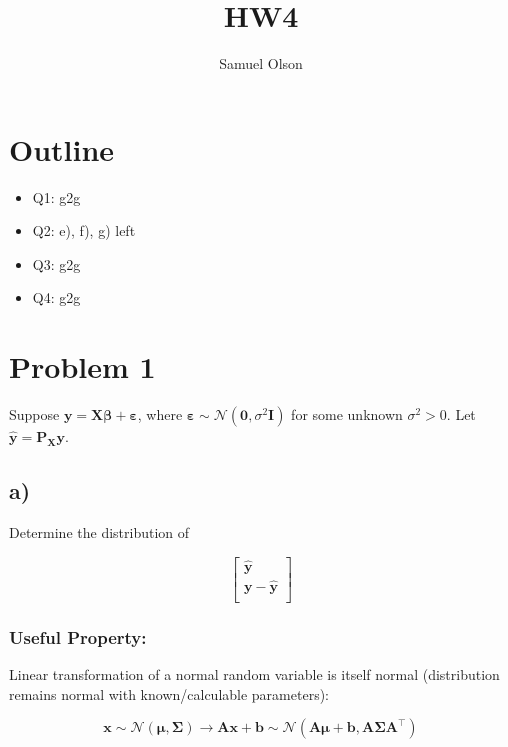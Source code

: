 \documentclass[
]{article}
\title{HW4}
\author{Samuel Olson}
\date{}
\providecommand{\tightlist}{%
  \setlength{\itemsep}{0pt}\setlength{\parskip}{0pt}}
\begin{document}
\maketitle

\section{Outline}\label{outline}

\begin{itemize}
\tightlist
\item
  Q1: g2g
\item
  Q2: e), f), g) left
\item
  Q3: g2g
\item
  Q4: g2g
\end{itemize}

\section{Problem 1}\label{problem-1}

Suppose
\(\boldsymbol{y} = \boldsymbol{X\beta} + \boldsymbol{\varepsilon}\),
where
\(\boldsymbol{\varepsilon} \sim \mathcal{N}(\boldsymbol{0},\sigma^2 \boldsymbol{I})\)
for some unknown \(\sigma^2 > 0\). Let
\(\boldsymbol{\hat{y}} = \boldsymbol{P_X y}\).

\subsection{a)}\label{a}

Determine the distribution of

\[
\begin{bmatrix}
\boldsymbol{\hat{y}} \\ 
\boldsymbol{y - \hat{y}} \\ 
\end{bmatrix}
\]

\subsubsection{Useful Property:}\label{useful-property}

Linear transformation of a normal random variable is itself normal
(distribution remains normal with known/calculable parameters):

\[
\boldsymbol{x} \sim \mathcal{N}(\boldsymbol{\mu}, \boldsymbol{\Sigma}) \rightarrow \boldsymbol{Ax} + \boldsymbol{b} \sim \mathcal{N}(\boldsymbol{A \mu} + \boldsymbol{b}, \boldsymbol{A \Sigma A ^{\top}})
\]
\end{document}
